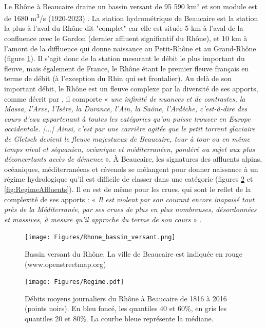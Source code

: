 \documentclass[11pt]{article}
\begin{document}
	\paragraph{} Le Rhône à Beaucaire draine un bassin versant de 95 590 km² et son module est de 1680 m\textsuperscript{3}/s (1920-2023) \citep{medd_banque_2021}. La station hydrométrique de Beaucaire est la station la plus à l'aval du Rhône dit "complet" car elle est située 5 km à l'aval de la confluence avec le Gardon (dernier affluent significatif du Rhône), et 10 km à l'amont de la diffluence qui donne naissance au Petit-Rhône et au Grand-Rhône (figure \ref{fig:BV}). Il s'agit donc de la station mesurant le débit le plus important du fleuve, mais également de France, le Rhône étant le premier fleuve français en terme de débit (à l'exception du Rhin qui est frontalier). Au delà de son important débit, le Rhône est un fleuve complexe par la diversité de ses apports, comme décrit par \citet{parde_regime_1925}, il comporte « \textit{ une infinité de nuances et de contrastes, la Massa, l'Arve, l'Isère, la Durance, l'Ain, la Saône, l'Ardèche, c'est-à-dire des cours d'eau appartenant à toutes les catégories qu'on puisse trouver en Europe occidentale. [...] Ainsi, c'est par une carrière agitée que le petit torrent glaciaire de Gletsch devient le fleuve majestueux de Beaucaire, tour à tour ou en même temps nival et séquanien, océanique et méditerranéen, pondéré ou sujet aux plus déconcertants accès de démence} ». À Beaucaire, les signatures des affluents alpins, océaniques, méditerranéens et cévenols se mélangent pour donner naissance à un régime hydrologique qu'il est difficile de classer dans une catégorie (figures \ref{fig:Regime} et \ref{fig:RegimeAffluents}). Il en est de même pour les crues, qui sont le reflet de la complexité de ses apports : « \textit{Il est violent par son courant encore inapaisé tout près de la Méditerranée, par ses crues de plus en plus nombreuses, désordonnées et massives, à mesure qu'il approche du terme de son cours} » \citep{parde_regime_1925}. 
	
		\begin{figure}[h!]
	\centering
		\texttt{[image: Figures/Rhone\_bassin\_versant.png]}
        \caption{Bassin versant du Rhône. La ville de Beaucaire est indiquée en rouge (www.openstreetmap.org)}	
		\label{fig:BV}
	\end{figure}
	
	\begin{figure}[h!]
	\centering
		\texttt{[image: Figures/Regime.pdf]}
        \caption{Débits moyens journaliers du Rhône à Beaucaire de 1816 à 2016 (points noirs). En bleu foncé, les quantiles 40 et 60\%, en gris les quantiles 20 et 80\%. La courbe bleue représente la médiane.}	
		\label{fig:Regime}
	\end{figure}
	
\end{document}
